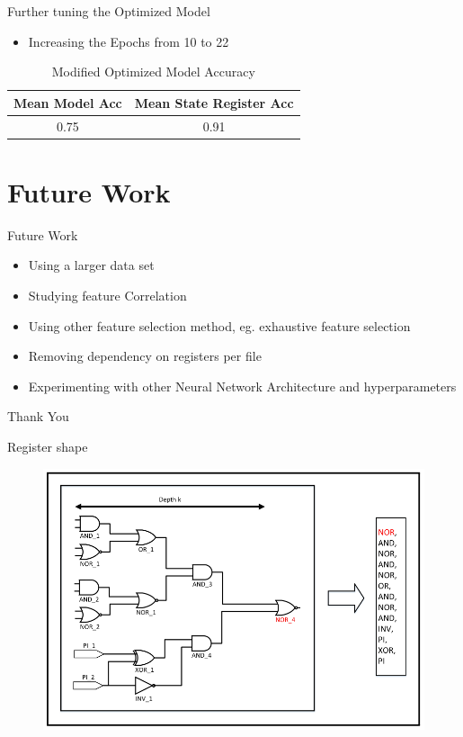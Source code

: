 \documentclass[aspectratio=169]{beamer}
\begin{document}
\begin{frame}{Further tuning the Optimized Model}
\begin{itemize}
	\item Increasing the Epochs from 10 to 22
\end{itemize}
\centering
\begin{table}
	\begin{tabular}{|c|c|}
		\hline
		Mean Model Acc & Mean State Register Acc\\
		\hline
	  	\hline
		0.75 & 0.91\\
  		\hline
	\end{tabular}
	\caption{Modified Optimized Model Accuracy}
	\label{tab:Modified Optimized Model Accuracy}
\end{table}
\end{frame}

\section{Future Work}
\begin{frame}{Future Work}
	\begin{itemize}
		\item Using a larger data set
		\item Studying feature Correlation
		\item Using other feature selection method, eg. exhaustive feature selection
		\item Removing dependency on registers per file
		\item Experimenting with other Neural Network Architecture and hyperparameters
	\end{itemize}
\end{frame}

\begin{frame}[c]{ }
	\begin{center}
		\Huge Thank You
	\end{center}
\end{frame}


\begin{frame}{Register shape}
\begin{figure}
	\includegraphics[scale=0.3]{./Results/vector/register_shape.png}
\end{figure}
\end{frame}
\end{document}
